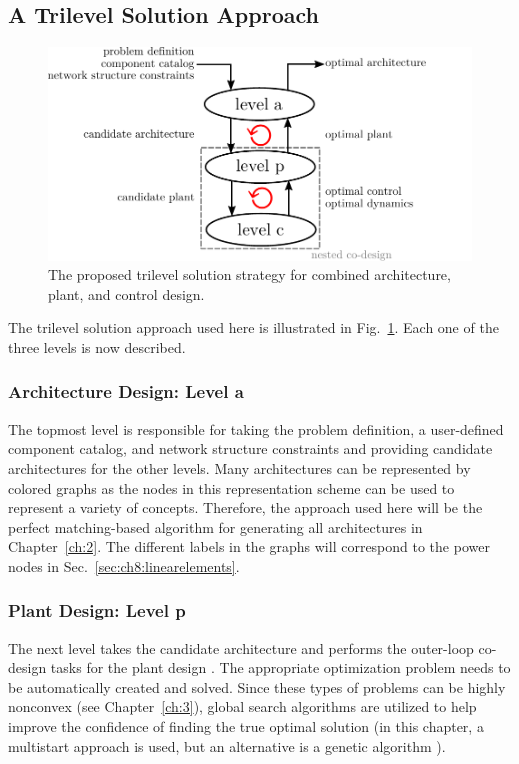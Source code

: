 \subsection{A Trilevel Solution Approach}

\begin{figure}
\centering
\includegraphics[scale=0.8]{../ch8/figures/trilevel}
\caption{The proposed trilevel solution strategy for combined architecture, plant, and control design.\label{fig:ch8:trilevel}}
\end{figure}

The trilevel solution approach used here is illustrated in Fig.~\ref{fig:ch8:trilevel}.
Each one of the three levels is now described.

\subsubsection{Architecture Design: Level a}

The topmost level is responsible for taking the problem definition, a user-defined component catalog, and network structure constraints and providing candidate architectures for the other levels.
Many architectures can be represented by colored graphs as the nodes in this representation scheme can be used to represent a variety of concepts. 
Therefore, the approach used here will be the perfect matching-based algorithm for generating all architectures in Chapter~\ref{ch:2}.
The different labels in the graphs will correspond to the power nodes in Sec.~\ref{sec:ch8:linearelements}.

\subsubsection{Plant Design: Level p}

The next level takes the candidate architecture and performs the outer-loop co-design tasks for the plant design \cite{Herber2017b}.
The appropriate optimization problem needs to be automatically created and solved.
Since these types of problems can be highly nonconvex (see Chapter~\ref{ch:3}), global search algorithms are utilized to help improve the confidence of finding the true optimal solution (in this chapter, a multistart approach is used, but an alternative is a genetic algorithm \cite{Papalambros2017a, Marti2003a, Eiben2003a}).

